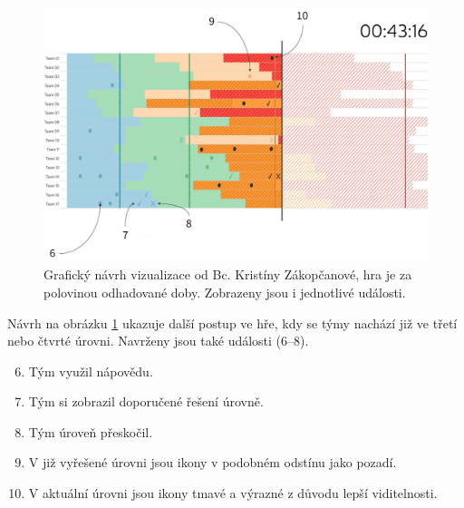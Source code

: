 \documentclass[
  digital, %
  oneside, %
  table,   %
  nolof,     %
  nolot,     %
]{fithesis3}
\begin{document}
\begin{figure}[H]
  \begin{center}
    \includegraphics[width=12.7cm]{images/navrh-vizualizace-2-4.png}
  \end{center}
  \caption{Grafický návrh vizualizace od Bc. Kristíny Zákopčanové, hra je za polovinou odhadované doby. Zobrazeny jsou i jednotlivé události.}
  \label{fig:progress2}
\end{figure}
Návrh na obrázku \ref{fig:progress2} ukazuje další postup ve hře, kdy se týmy nachází již ve třetí nebo čtvrté úrovni. Navrženy jsou také události (6–8).
\begin{enumerate}
  \setcounter{enumi}{5}
  \item Tým využil nápovědu.
  \item Tým si zobrazil doporučené řešení úrovně.
  \item Tým úroveň přeskočil.
  \item V již vyřešené úrovni jsou ikony v podobném odstínu jako pozadí.
  \item V aktuální úrovni jsou ikony tmavé a výrazné z důvodu lepší viditelnosti.
\end{enumerate}
\end{document}
